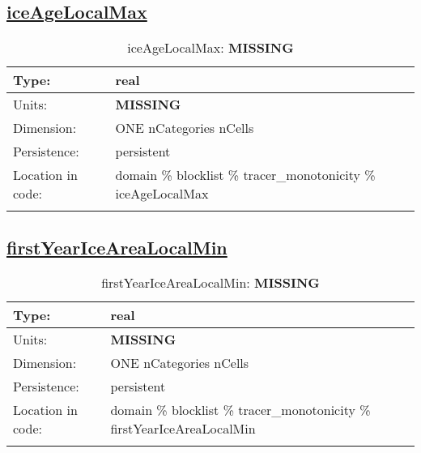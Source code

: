 \subsection[iceAgeLocalMax]{\hyperref[sec:var_tab_tracer_monotonicity]{iceAgeLocalMax}}
\label{subsec:var_sec_tracer_monotonicity_iceAgeLocalMax}
\begin{center}
\begin{longtable}{| p{2.0in} | p{4.0in} |}
        \hline 
        Type: & real \\
        \hline 
        Units: & {\bf \color{red} MISSING} \\
        \hline 
        Dimension: & ONE nCategories nCells \\
        \hline 
        Persistence: & persistent \\
        \hline 
         Location in code: & domain \% blocklist \% tracer\_monotonicity \% iceAgeLocalMax \\
         \hline 
    \caption{iceAgeLocalMax: {\bf \color{red} MISSING}}
\end{longtable}
\end{center}
\subsection[firstYearIceAreaLocalMin]{\hyperref[sec:var_tab_tracer_monotonicity]{firstYearIceAreaLocalMin}}
\label{subsec:var_sec_tracer_monotonicity_firstYearIceAreaLocalMin}
\begin{center}
\begin{longtable}{| p{2.0in} | p{4.0in} |}
        \hline 
        Type: & real \\
        \hline 
        Units: & {\bf \color{red} MISSING} \\
        \hline 
        Dimension: & ONE nCategories nCells \\
        \hline 
        Persistence: & persistent \\
        \hline 
         Location in code: & domain \% blocklist \% tracer\_monotonicity \% firstYearIceAreaLocalMin \\
         \hline 
    \caption{firstYearIceAreaLocalMin: {\bf \color{red} MISSING}}
\end{longtable}
\end{center}
